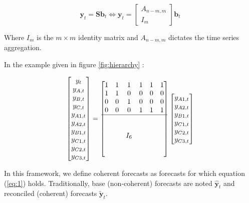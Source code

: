 \documentclass[letterpaper]{article}
\begin{document}
\begin{equation}
    \mathbf{y}_t = \mathbf{Sb}_t  \Leftrightarrow   \mathbf{y}_t = \begin{bmatrix}
 A_{n-m,m} \\
 I_{m}
\end{bmatrix}\mathbf{b}_t
    \label{eq:1}
\end{equation}

Where $I_m$ is the $m \times m$ identity matrix and $A_{n-m,m}$ dictates the time series aggregation.

In the example given in figure \ref{fig:hierarchy} :

\begin{equation}
    \begin{bmatrix}
    y_{t} \\
    y_{A,t} \\
    y_{B,t} \\
    y_{C,t} \\
    y_{A1,t} \\
    y_{A2,t} \\
    y_{B1,t} \\
    y_{C1,t} \\
    y_{C2,t} \\
    y_{C3,t}
  \end{bmatrix}=
  \begin{bmatrix}
    1 & 1 & 1 & 1 & 1 & 1\\
    1 & 1 & 0 & 0 & 0 & 0\\
    0 & 0 & 1 & 0 & 0 & 0\\
    0 & 0 & 0 & 1 & 1 & 1\\
    \hline \\
    \\
    & &  I_6& & \\
    \\
    \\
  \end{bmatrix}
  \begin{bmatrix}
    y_{A1,t} \\
    y_{A2,t} \\
    y_{B1,t} \\
    y_{C1,t} \\
    y_{C2,t} \\
    y_{C3,t}
  \end{bmatrix}
\end{equation}

In this framework, we define coherent forecasts as forecasts for which equation (\ref{eq:1}) holds. Traditionally, base (non-coherent) forecasts are noted $\hat{\mathbf{y}}_t$ and reconciled (coherent) forecasts $\tilde{\mathbf{y}}_t$.
\end{document}
